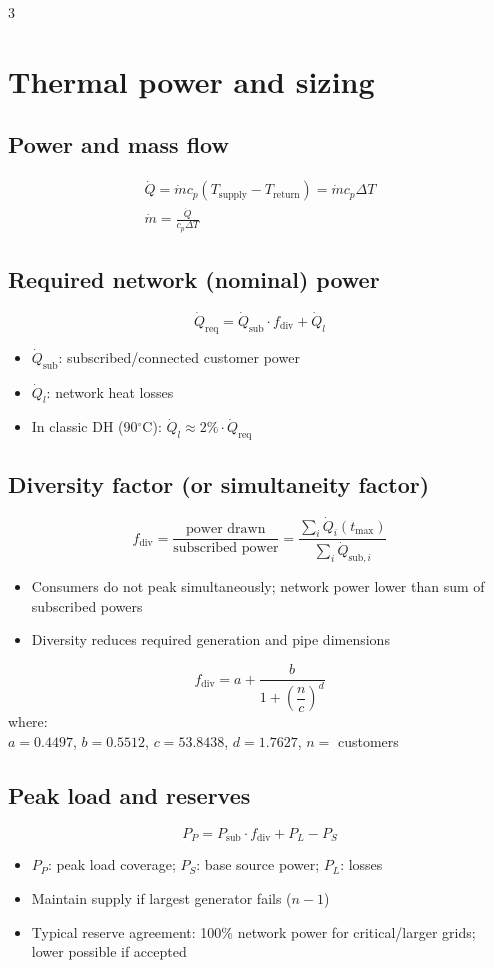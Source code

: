 \documentclass[9pt, landscape, a4paper]{article}
\newcommand{\cel}{\ensuremath{^\circ}C}
\begin{document}
\begin{multicols*}{3}
\section{Thermal power and sizing}
\subsection{Power and mass flow}
\begin{gather*}
  \dot Q = \dot m c_p (T_\text{supply} - T_\text{return})= \dot m c_p \Delta T\\
  \dot m = \frac{\dot Q}{c_p\Delta T}
\end{gather*}

\subsection{Required network (nominal) power}
\[\dot Q_\text{req} = \dot Q_\text{sub}\cdot f_\text{div} + \dot Q_l\]
\begin{itemize}
  \item $\dot Q_\text{sub}$: subscribed/connected customer power
  \item $\dot Q_l$: network heat losses
  \item In classic DH (90\cel): $\dot{Q}_l \approx 2\% \cdot \dot{Q}_\text{req}$
\end{itemize}

\subsection{Diversity factor (or simultaneity factor)}
\[f_\text{div} = \frac{\text{power drawn}}{\text{subscribed power}} = \frac{\sum_i \dot Q_i(t_\text{max})}{\sum_i \dot Q_{\text{sub},i}}\]
\begin{itemize}
  \item Consumers do not peak simultaneously; network power lower than sum of subscribed powers
  \item Diversity reduces required generation and pipe dimensions
\end{itemize}
\[f_\text{div} = a + \frac{b}{1+\left(\dfrac{n}{c}\right)^d}\]
where:\\
$a = 0.4497$, $b = 0.5512$, $c = 53.8438$, $d = 1.7627$, $n =$ customers

\subsection{Peak load and reserves}
\[
  P_P = P_\text{sub}\cdot f_\text{div} + P_L - P_S
\]
\begin{itemize}
  \item $P_P$: peak load coverage; $P_S$: base source power; $P_L$: losses
  \item Maintain supply if largest generator fails ($n-1$)
  \item Typical reserve agreement: 100\% network power for critical/larger grids; lower possible if accepted
\end{itemize}


\end{multicols*}
\end{document}
